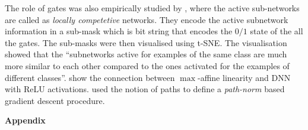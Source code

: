 The role of gates was also empirically studied by \cite{srivastava2014understanding}, where the active sub-networks are called as \emph{locally competetive} networks. They encode the active subnetwork information in a sub-mask which is bit string that encodes the $0/1$ state of the all the gates. The sub-masks were then visualised using t-SNE. The visualisation showed that the ``subnetworks active for examples of the same class are much more similar to each other compared to the ones activated for the examples of different classes''. \cite{balestriero2018spline} show the connection between $\max$-affine linearity and DNN with ReLU activations. \cite{neyshabur2015path} used the notion of paths to define a \emph{path-norm} based gradient descent procedure. 







\newpage
\begin{center}
{\Large{\textbf{Appendix}}}
\end{center}

